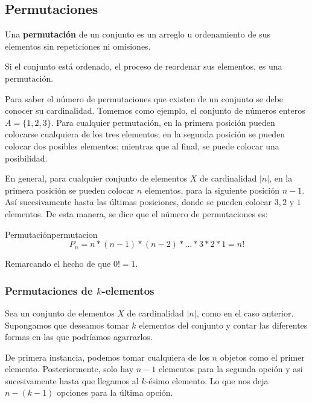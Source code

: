 
\subsection{Permutaciones}

\begin{tcolorbox}[colback=blue!5!white,colframe=blue!60!black,title=Definición: Permutación]
	Una \textbf{permutaci\'on} de un conjunto es un arreglo u ordenamiento de sus
	elementos sin repeticiones ni omisiones.
	
	Si el conjunto está ordenado, el proceso de reordenar sus elementos, es una permutación.
	\label{Permutaciones_definition}
\end{tcolorbox}

Para saber el n\'umero de permutaciones que existen de un conjunto se debe
conocer su cardinalidad. Tomemos como ejemplo, el conjunto de n\'umeros enteros
$A=\{1, 2, 3\}$. Para cualquier permutaci\'on, en la primera posici\'on pueden
colocarse cualquiera de los tres elementos; en la segunda posición se pueden
colocar dos posibles elementos; mientras que al final, se puede colocar una
posibilidad.

En general, para cualquier conjunto de elementos $X$ de cardinalidad $|n|$, en
la primera posici\'on se pueden colocar $n$ elementos, para la siguiente
posici\'on $n-1$. Así sucesivamente hasta las \'ultimas posiciones, donde se
pueden colocar $3, 2$ y $1$ elementos. De esta manera, se dice que el n\'umero
de permutaciones es:

\begin{theorem}{Permutación}{permutacion}
	\begin{equation}
		P_n=n*(n-1)*(n-2)*...*3*2*1=n!
		\label{permutaciones_totales}
	\end{equation}
	
	Remarcando el hecho de que $0! = 1$.

\end{theorem}

\subsubsection{Permutaciones de $k$-elementos}

Sea un conjunto de elementos $X$ de cardinalidad $|n|$, como en el caso
anterior. Supongamos que deseamos tomar $k$ elementos del conjunto y contar las
diferentes formas en las que podríamos agarrarlos.

De primera instancia, podemos tomar cualquiera de los $n$ objetos como el primer
elemento. Posteriormente, solo hay $n-1$ elementos para la segunda opción y asi
sucesivamente hasta que llegamos al $k$-ésimo elemento. Lo que nos deja
$n-(k-1)$ opciones para la última opción.

